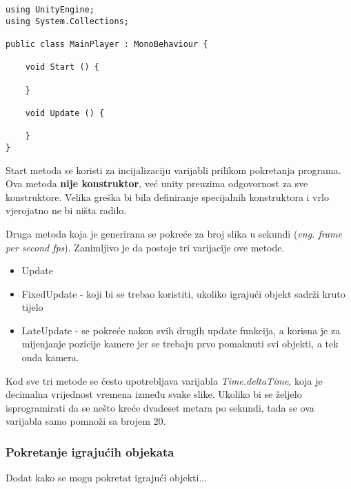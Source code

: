 \begin{lstlisting}[caption={Primjer skripte}, label=primjerSkripte]
using UnityEngine;
using System.Collections;

public class MainPlayer : MonoBehaviour {

    void Start () {
    
    }
    
    void Update () {
    
    }
}
\end{lstlisting}
Start metoda se koristi za incijalizaciju varijabli prilikom pokretanja programa. Ova metoda \textbf{nije konstruktor}, već unity preuzima odgovornost za sve konstruktore. Velika greška bi bila definiranje specijalnih konstruktora i vrlo vjerojatno ne bi ništa radilo. \par
Druga metoda koja je generirana se pokreće za broj slika u sekundi (\emph{eng. frame per second fps}). Zanimljivo je da postoje tri varijacije ove metode.
\begin{itemize} 
	\item Update
	\item FixedUpdate - koji bi se trebao koristiti, ukoliko igrajući objekt sadrži kruto tijelo
	\item LateUpdate - se pokreće nakon svih drugih update funkcija, a korisna je za mijenjanje pozicije kamere jer se trebaju prvo pomaknuti svi objekti, a tek onda kamera. 
\end{itemize}
Kod sve tri metode se često upotrebljava varijabla \textit{Time.deltaTime}, koja je decimalna vrijednost vremena između svake slike. Ukoliko bi se željelo isprogramirati da se nešto kreće dvadeset metara po sekundi, tada se ova varijabla samo pomnoži sa brojem 20.
\subsubsection{Pokretanje igrajućih objekata}
Dodat kako se mogu pokretat igrajući objekti...